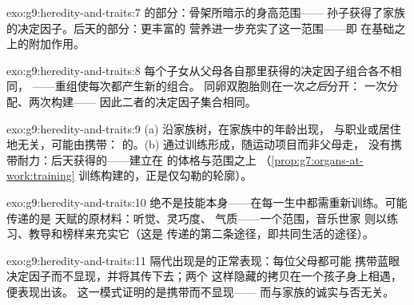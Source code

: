 \begin{solution}{exo:g9:heredity-and-traits:7}
的部分：骨架所暗示的身高范围——
孙子获得了家族的决定因子。后天的部分：更丰富的
营养进一步充实了这一范围——即
在基础之上的附加作用。
\end{solution}

\begin{solution}{exo:g9:heredity-and-traits:8}
每个子女从父母各自那里获得的决定因子组合各不相同，
——重组使每次都产生新的组合。
同卵双胞胎则在一次\emph{之后}分开：
一次分配、两次构建——
因此二者的决定因子集合相同。
\end{solution}

\begin{solution}{exo:g9:heredity-and-traits:9}
(a) 沿家族树，在家族中的年龄出现，
与职业或居住地无关，可能由携带：
的。(b) 通过训练形成，随运动项目而非父母走，
没有携带耐力：后天获得的——建立在
的体格与范围之上
（\cref{prop:g7:organs-at-work:training}
训练构建的，正是仅勾勒的轮廓）。
\end{solution}

\begin{solution}{exo:g9:heredity-and-traits:10}
绝不是技能本身——在每一生中都需重新训练。可能传递的是
天赋的原材料：听觉、灵巧度、
气质——一个范围，音乐世家
则以练习、教导和榜样来充实它（这是
传递的第二条途径，即共同生活的途径）。
\end{solution}

\begin{solution}{exo:g9:heredity-and-traits:11}
隔代出现是的正常表现：每位父母都可能
携带蓝眼决定因子而不显现，并将其传下去；两个
这样隐藏的拷贝在一个孩子身上相遇，便表现出该。
这一模式证明的是携带而不显现——
而与家族的诚实与否无关。
\end{solution}

